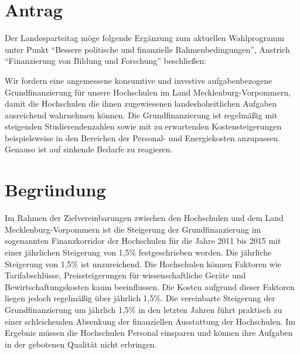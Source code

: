 \section{Antrag}

Der Landesparteitag möge folgende Ergänzung zum aktuellen Wahlprogramm unter Punkt ``Bessere politische und finanzielle Rahmenbedingungen'', Anstrich ``Finanzierung von Bildung und Forschung'' beschließen:

Wir fordern eine angemessene konsumtive und investive aufgabenbezogene Grundfinanzierung für unsere Hochschulen im Land Mecklenburg-Vorpommern, damit die Hochschulen die ihnen zugewiesenen landeshoheitlichen Aufgaben ausreichend wahrnehmen können. Die Grundfinanzierung ist regelmäßig mit steigenden Studierendenzahlen sowie mit zu erwartenden Kostensteigerungen beispielsweise in den Bereichen der Personal- und Energiekosten anzupassen. Genauso ist auf sinkende Bedarfe zu reagieren.

\section{Begründung}

Im Rahmen der Zielvereinbarungen zwischen den Hochschulen und dem Land Mecklenburg-Vorpommern ist die Steigerung der Grundfinanzierung im sogenannten Finanzkorridor der Hochschulen für die Jahre 2011 bis 2015 mit einer jährlichen Steigerung von 1,5\% festgeschrieben worden. Die jährliche Steigerung von 1,5\% ist unzureichend. Die Hochschulen können Faktoren wie Tarifabschlüsse, Preissteigerungen für wissenschaftliche Geräte und Bewirtschaftungskosten kaum beeinflussen. Die Kosten aufgrund dieser Faktoren liegen jedoch regelmäßig über jährlich 1,5\%. Die vereinbarte Steigerung der Grundfinanzierung um jährlich 1,5\% in den letzten Jahren führt praktisch zu einer schleichenden Absenkung der finanziellen Ausstattung der Hochschulen. Im Ergebnis müssen die Hochschulen Personal einsparen und können ihre Aufgaben in der gebotenen Qualität nicht erbringen.

